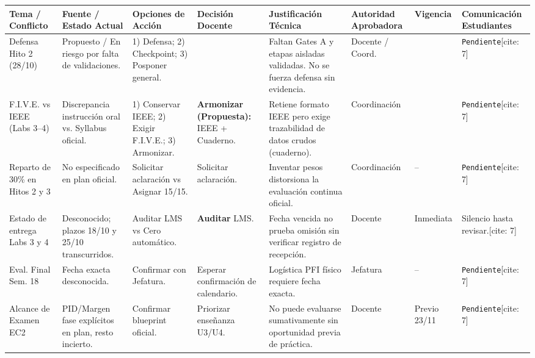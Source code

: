 \documentclass[10pt, a4paper, landscape]{article}
\begin{document}
\begin{table}[htbp]
    \centering
    \scriptsize
    \renewcommand{\arraystretch}{1.5}
    \begin{tabularx}{\textwidth}{|P{2.2cm}|P{2.5cm}|P{2.6cm}|P{2.4cm}|P{3.5cm}|P{2.0cm}|P{1.6cm}|Y|}
    \hline
    \textbf{Tema / Conflicto} & \textbf{Fuente / Estado Actual} & \textbf{Opciones de Acción} & \textbf{Decisión Docente} & \textbf{Justificación Técnica} & \textbf{Autoridad Aprobadora} & \textbf{Vigencia} & \textbf{Comunicación Estudiantes} \\ \hline
    Defensa Hito 2 (28/10) & Propuesto / En riesgo por falta de validaciones. & 1) Defensa; 2) Checkpoint; 3) Posponer general. & & Faltan Gates A y etapas aisladas validadas. No se fuerza defensa sin evidencia. & Docente / Coord. & & \texttt{Pendiente}[cite: 7] \\ \hline
    F.I.V.E. vs IEEE (Labs 3--4) & Discrepancia instrucción oral vs. Syllabus oficial. & 1) Conservar IEEE; 2) Exigir F.I.V.E.; 3) Armonizar. & \textbf{Armonizar (Propuesta):} IEEE + Cuaderno. & Retiene formato IEEE pero exige trazabilidad de datos crudos (cuaderno). & Coordinación & & \texttt{Pendiente}[cite: 7] \\ \hline
    Reparto de 30\% en Hitos 2 y 3 & No especificado en plan oficial. & Solicitar aclaración vs Asignar 15/15. & Solicitar aclaración. & Inventar pesos distorsiona la evaluación continua oficial. & Coordinación & -- & \texttt{Pendiente}[cite: 7] \\ \hline
    Estado de entrega Labs 3 y 4 & Desconocido; plazos 18/10 y 25/10 transcurridos. & Auditar LMS vs Cero automático. & \textbf{Auditar} LMS. & Fecha vencida no prueba omisión sin verificar registro de recepción. & Docente & Inmediata & Silencio hasta revisar.[cite: 7] \\ \hline
    Eval. Final Sem. 18 & Fecha exacta desconocida. & Confirmar con Jefatura. & Esperar confirmación de calendario. & Logística PFI físico requiere fecha exacta. & Jefatura & -- & \texttt{Pendiente}[cite: 7] \\ \hline
    Alcance de Examen EC2 & PID/Margen fase explícitos en plan, resto incierto. & Confirmar blueprint oficial. & Priorizar enseñanza U3/U4. & No puede evaluarse sumativamente sin oportunidad previa de práctica. & Docente & Previo 23/11 & \texttt{Pendiente}[cite: 7] \\ \hline
    \end{tabularx}
\end{table}
\end{document}
